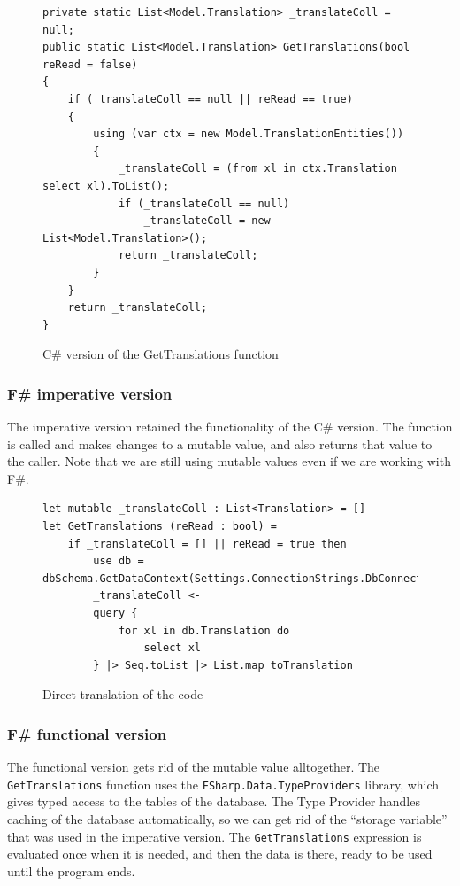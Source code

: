 \documentclass[12pt, a4paper]{article}
\newcommand{\code}[1]{{\small \texttt{#1}}}
\begin{document}
\begin{figure}[!h]
\begin{lstlisting}
private static List<Model.Translation> _translateColl = null; 
public static List<Model.Translation> GetTranslations(bool reRead = false)
{
    if (_translateColl == null || reRead == true)
    {
        using (var ctx = new Model.TranslationEntities())
        {
            _translateColl = (from xl in ctx.Translation select xl).ToList();
            if (_translateColl == null)
                _translateColl = new List<Model.Translation>();
            return _translateColl;
        }
    }
    return _translateColl;
}
\end{lstlisting}
\caption{C\# version of the GetTranslations function}
\end{figure}

\newpage


\subsubsection{F\# imperative version}
The imperative version retained the functionality of the C\# version. The function is called and makes changes to a mutable value, and also returns that value to the caller. Note that we are still using mutable values even if we are working with F\#.

\begin{figure}[!h]
\begin{lstlisting}
let mutable _translateColl : List<Translation> = []
let GetTranslations (reRead : bool) =
    if _translateColl = [] || reRead = true then
        use db = dbSchema.GetDataContext(Settings.ConnectionStrings.DbConnectionString)
        _translateColl <- 
        query {
            for xl in db.Translation do 
                select xl
        } |> Seq.toList |> List.map toTranslation
\end{lstlisting}
\caption{Direct translation of the code}
\end{figure}

\newpage


\subsubsection{F\# functional version}
The functional version gets rid of the mutable value alltogether. The \code{GetTranslations} function uses the \code{FSharp.Data.TypeProviders} library, which gives typed access to the tables of the database. The Type Provider handles caching of the database automatically, so we can get rid of the “storage variable” that was used in the imperative version. The \code{GetTranslations} expression is evaluated once when it is needed, and then the data is there, ready to be used until the program ends.
\end{document}
